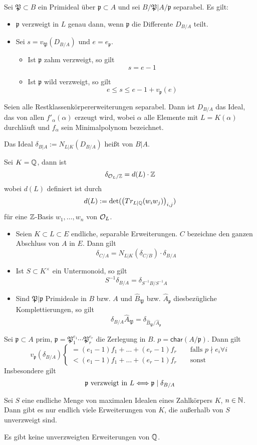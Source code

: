 \documentclass{book}
\renewcommand{\i}{^{-1}}
\newcommand{\pf}{\mathfrak{p}}
\newcommand{\Pf}{\mathfrak{P}}
\begin{document}
\Satz{}
Sei $\Pf \subset B$ ein Primideal über $\pf \subset A$ und sei $B/\Pf | A / \pf$ separabel. Es gilt:
\begin{itemize}
	\item $\pf$ verzweigt in $L$ genau dann, wenn $\pf$ die Differente $D_{B/A}$ teilt.
	\item Sei $s = v_\Pf(D_{B/A})$ und $e = e_\pf$.
	\begin{itemize}
		\item Ist $\pf$ zahm verzweigt, so gilt
		\[ s = e - 1\]
		\item Ist $\pf$ wild verzweigt, so gilt
		\[ e \leq s \leq e - 1 + v_\pf(e) \]
	\end{itemize}
\end{itemize}

\Satz{}
Seien alle Restklassenkörpererweiterungen separabel. Dann ist $D_{B/A}$ das Ideal, das von allen $f'_\alpha(\alpha)$ erzeugt wird, wobei $\alpha$ alle Elemente mit $L = K(\alpha)$ durchläuft und $f_\alpha$ sein Minimalpolynom bezeichnet.

Das Ideal $\delta_{B|A} := N_{L|K}(D_{B/A})$ heißt  von $B|A$.

\Satz{}
Sei $K = \mathbb{Q}$, dann ist
\[ \delta_{\mathcal{O}_L/\mathbb{Z}}  = d(L)\cdot \mathbb{Z} \]
wobei $d(L)$ definiert ist durch
\[ d(L) := \det( \left(Tr_{L|\mathbb{Q}} (w_i w_j)\right)_{i,j} ) \]
für eine $\mathbb{Z}$-Basis $w_1,\ldots, w_n$ von $\mathcal{O}_L$.

\Satz{}
\begin{itemize}
	\item Seien $K\subset L\subset E$ endliche, separable Erweiterungen. $C$ bezeichne den ganzen Abschluss von $A$ in $E$. Dann gilt
	\[ \delta_{C/A} = N_{L|K}(\delta_{C/B}) \cdot \delta_{B/A} \]
	\item Ist $S \subset K^\times$ ein Untermonoid, so gilt
	\[ S\i \delta_{B/A} = \delta_{S\i B / S\i A} \]
	\item Sind $\Pf |\pf$ Primideale in $B$ bzw. $A$ und $\widehat{B}_\Pf$ bzw. $\widehat{A}_\pf$ diesbezügliche Komplettierungen, so gilt
	\[ \delta_{B/A} \widehat{A}_\Pf = \delta_{\widehat{B}_\Pf / \widehat{A}_\pf} \]
\end{itemize}

\Satz{}
Sei $\pf \subset A$ prim, $\pf = \Pf_1^{e_1} \cdots \Pf_r^{e_r}$ die Zerlegung in $B$. $p = \textsf{char}(A/\pf)$. Dann gilt
\[ v_\pf (\delta_{B/A}) \left\lbrace
\begin{aligned}
= (e_1 - 1) f_1 + \ldots + (e_r - 1)f_r && \text{ falls } p \nmid e_i \forall i\\
<(e_1 - 1) f_1 + \ldots + (e_r - 1)f_r && \text{ sonst}
\end{aligned}
\right. \]
Insbesondere gilt
\[ \pf \text{ verzweigt in }L \Gdw{} \pf \mid \delta_{B/A} \]

\Satz{}
Sei $S$ eine endliche Menge von maximalen Idealen eines Zahlkörpers $K$, $n\in \mathbb{N}$.\\
Dann gibt es nur endlich viele Erweiterungen von $K$, die außerhalb von $S$ unverzweigt sind.

\Satz{}
Es gibt keine unverzweigten Erweiterungen von $\mathbb{Q}$.

\printindex
\end{document}
